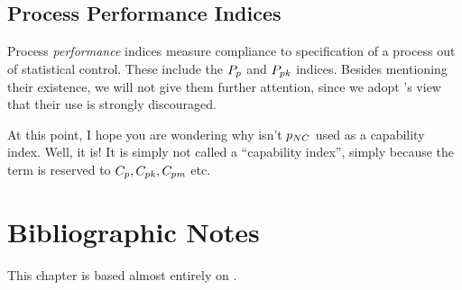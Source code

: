 \subsection{Process Performance Indices}
Process \emph{performance} indices measure compliance to specification of a process out of statistical control. 
These include the $P_{p}$ and $P_{pk}$ indices. 
Besides mentioning their existence, we will not give them further attention, since we adopt \cite{montgomery_introduction_2007}'s view that their use is strongly discouraged. 


\begin{remark}
At this point, I hope you are wondering why isn't $p_{NC}$ used as a capability index. 
Well, it is! 
It is simply not called a ``capability index'', simply because the term is reserved to $C_p, C_{pk}, C_{pm}$ etc.
\end{remark}



\section{Bibliographic Notes}
This chapter is based almost entirely on \cite{montgomery_introduction_2007}.